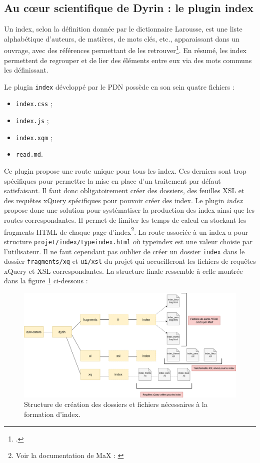 \documentclass[a4paper,12pt,twoside]{book}
\begin{document}
\subsection{Au c\oe{}ur scientifique de Dyrin : le plugin index}
Un index, selon la définition donnée par le dictionnaire Larousse, est une \og liste alphabétique d'auteurs, de matières, de mots clés, etc., apparaissant dans un ouvrage, avec des références permettant de les retrouver\fg\footcite{larousse}. En résumé, les index permettent de regrouper et de lier des éléments entre eux via des mots communs les définissant.

Le plugin \texttt{index} développé par le \acrshort{PDN} possède en son sein quatre fichiers :
\begin{itemize}
    \item \texttt{index.css} ;
    \item \texttt{index.js} ;
    \item \texttt{index.xqm} ;
    \item \texttt{read.md}.
\end{itemize}

Ce plugin propose une route unique pour tous les index. Ces derniers sont trop spécifiques pour permettre la mise en place d'un traitement par défaut satisfaisant. Il faut donc obligatoirement créer des dossiers, des feuilles \acrshort{XSL} et des requêtes xQuery spécifiques pour pouvoir créer des index.
Le plugin \textit{index} propose donc une solution pour systématiser la production des index ainsi que les routes correspondantes.
Il permet de limiter les temps de calcul en stockant les fragments \acrshort{HTML} de chaque page d'index\footnote{Voir la documentation de MaX : \cite{maxdoc}}. La route associée à un index a pour structure \texttt{projet/index/typeindex.html} où \og typeindex \fg{} est une valeur choisie par l'utilisateur. Il ne faut cependant pas oublier de créer un dossier \texttt{index} dans le dossier \texttt{fragments/xq} et \texttt{ui/xsl} du projet qui accueilleront les fichiers de requêtes xQuery et \acrshort{XSL} correspondantes. La structure finale ressemble à celle montrée dans la figure \ref{index} ci-dessous :

\begin{figure}[H]
    \centering
    \includegraphics[width=13cm]{img/partie_3/index.png}
    \caption{Structure de création des dossiers et fichiers nécessaires à la formation d'index.}
    \label{index}
\end{figure}
\end{document}
